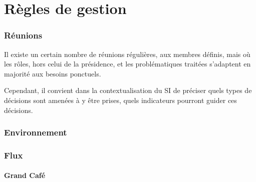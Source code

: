 \section{Règles de gestion}
\label{gestion}

\subsubsection{Réunions}
Il existe un certain nombre de réunions régulières, aux membres définis,
mais où les rôles, hors celui de la présidence, et les problématiques
traitées s'adaptent en majorité aux besoins ponctuels.

Cependant, il convient dans la contextualisation du SI de préciser quels types
de décisions sont amenées à y être prises, quels indicateurs pourront guider
ces décisions.

\subsubsection{Environnement}
\subsubsection{Flux}
\paragraph{Grand Café}
